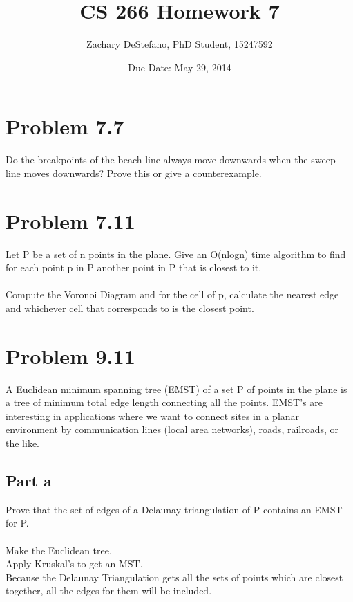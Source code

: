 \documentclass[11pt,psfig]{article}
\begin{document}
\setlength{\parskip}{1.2ex plus0.3ex minus 0.3ex}


\thispagestyle{empty} \pagestyle{myheadings} 



\title{CS 266 Homework 7}
\author{Zachary DeStefano, PhD Student, 15247592}
\date{Due Date: May 29, 2014}

\maketitle

\vfill\eject

\section*{Problem 7.7}
Do the breakpoints of the beach line always move downwards when the
sweep line moves downwards? Prove this or give a counterexample.

\section*{Problem 7.11}

Let P be a set of n points in the plane. Give an O(nlogn) time algorithm
to find for each point p in P another point in P that is closest to it.\\
\\
Compute the Voronoi Diagram and for the cell of p, calculate the nearest edge and whichever cell that corresponds to is the closest point. 

\section*{Problem 9.11}

A Euclidean minimum spanning tree (EMST) of a set P of points in the
plane is a tree of minimum total edge length connecting all the points.
EMST’s are interesting in applications where we want to connect sites
in a planar environment by communication lines (local area networks),
roads, railroads, or the like.\\

\subsection*{Part a}
Prove that the set of edges of a Delaunay triangulation of P contains
an EMST for P.\\
\\
Make the Euclidean tree. \\
Apply Kruskal's to get an MST. \\
Because the Delaunay Triangulation gets all the sets of points which are closest together, all the edges for them will be included. 
\end{document}

